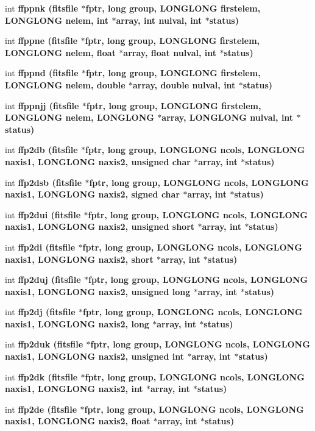 \begin{CompactItemize}
int \bf{ffppnk} (\bf{fitsfile} $\ast$fptr, long group, \bf{LONGLONG} firstelem, \bf{LONGLONG} nelem, int $\ast$array, int nulval, int $\ast$status)
\item 
int \bf{ffppne} (\bf{fitsfile} $\ast$fptr, long group, \bf{LONGLONG} firstelem, \bf{LONGLONG} nelem, float $\ast$array, float nulval, int $\ast$status)
\item 
int \bf{ffppnd} (\bf{fitsfile} $\ast$fptr, long group, \bf{LONGLONG} firstelem, \bf{LONGLONG} nelem, double $\ast$array, double nulval, int $\ast$status)
\item 
int \bf{ffppnjj} (\bf{fitsfile} $\ast$fptr, long group, \bf{LONGLONG} firstelem, \bf{LONGLONG} nelem, \bf{LONGLONG} $\ast$array, \bf{LONGLONG} nulval, int $\ast$status)
\item 
int \bf{ffp2db} (\bf{fitsfile} $\ast$fptr, long group, \bf{LONGLONG} ncols, \bf{LONGLONG} naxis1, \bf{LONGLONG} naxis2, unsigned char $\ast$array, int $\ast$status)
\item 
int \bf{ffp2dsb} (\bf{fitsfile} $\ast$fptr, long group, \bf{LONGLONG} ncols, \bf{LONGLONG} naxis1, \bf{LONGLONG} naxis2, signed char $\ast$array, int $\ast$status)
\item 
int \bf{ffp2dui} (\bf{fitsfile} $\ast$fptr, long group, \bf{LONGLONG} ncols, \bf{LONGLONG} naxis1, \bf{LONGLONG} naxis2, unsigned short $\ast$array, int $\ast$status)
\item 
int \bf{ffp2di} (\bf{fitsfile} $\ast$fptr, long group, \bf{LONGLONG} ncols, \bf{LONGLONG} naxis1, \bf{LONGLONG} naxis2, short $\ast$array, int $\ast$status)
\item 
int \bf{ffp2duj} (\bf{fitsfile} $\ast$fptr, long group, \bf{LONGLONG} ncols, \bf{LONGLONG} naxis1, \bf{LONGLONG} naxis2, unsigned long $\ast$array, int $\ast$status)
\item 
int \bf{ffp2dj} (\bf{fitsfile} $\ast$fptr, long group, \bf{LONGLONG} ncols, \bf{LONGLONG} naxis1, \bf{LONGLONG} naxis2, long $\ast$array, int $\ast$status)
\item 
int \bf{ffp2duk} (\bf{fitsfile} $\ast$fptr, long group, \bf{LONGLONG} ncols, \bf{LONGLONG} naxis1, \bf{LONGLONG} naxis2, unsigned int $\ast$array, int $\ast$status)
\item 
int \bf{ffp2dk} (\bf{fitsfile} $\ast$fptr, long group, \bf{LONGLONG} ncols, \bf{LONGLONG} naxis1, \bf{LONGLONG} naxis2, int $\ast$array, int $\ast$status)
\item 
int \bf{ffp2de} (\bf{fitsfile} $\ast$fptr, long group, \bf{LONGLONG} ncols, \bf{LONGLONG} naxis1, \bf{LONGLONG} naxis2, float $\ast$array, int $\ast$status)

\end{CompactItemize}

